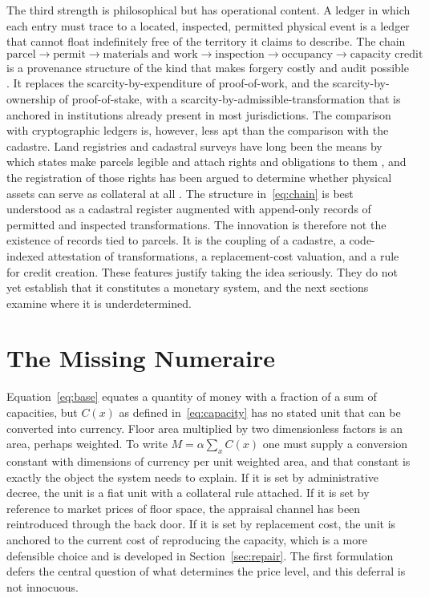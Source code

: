 \documentclass[11pt]{article}
\theoremstyle{definition}
\begin{document}
The third strength is philosophical but has operational content. A ledger in which each entry must trace to a located, inspected, permitted physical event is a ledger that cannot float indefinitely free of the territory it claims to describe. The chain
\begin{equation}
\text{parcel} \to \text{permit} \to \text{materials and work} \to \text{inspection} \to \text{occupancy} \to \text{capacity credit}
\label{eq:chain}
\end{equation}
is a provenance structure of the kind that makes forgery costly and audit possible \cite{buneman2001}. It replaces the scarcity-by-expenditure of proof-of-work, and the scarcity-by-ownership of proof-of-stake, with a scarcity-by-admissible-transformation that is anchored in institutions already present in most jurisdictions. The comparison with cryptographic ledgers is, however, less apt than the comparison with the cadastre. Land registries and cadastral surveys have long been the means by which states make parcels legible and attach rights and obligations to them \cite{scott1998}, and the registration of those rights has been argued to determine whether physical assets can serve as collateral at all \cite{desoto2000}. The structure in~\eqref{eq:chain} is best understood as a cadastral register augmented with append-only records of permitted and inspected transformations. The innovation is therefore not the existence of records tied to parcels. It is the coupling of a cadastre, a code-indexed attestation of transformations, a replacement-cost valuation, and a rule for credit creation. These features justify taking the idea seriously. They do not yet establish that it constitutes a monetary system, and the next sections examine where it is underdetermined.

\section{The Missing Numeraire}

Equation~\eqref{eq:base} equates a quantity of money with a fraction of a sum of capacities, but $C(x)$ as defined in~\eqref{eq:capacity} has no stated unit that can be converted into currency. Floor area multiplied by two dimensionless factors is an area, perhaps weighted. To write $M=\alpha\sum_x C(x)$ one must supply a conversion constant with dimensions of currency per unit weighted area, and that constant is exactly the object the system needs to explain. If it is set by administrative decree, the unit is a fiat unit with a collateral rule attached. If it is set by reference to market prices of floor space, the appraisal channel has been reintroduced through the back door. If it is set by replacement cost, the unit is anchored to the current cost of reproducing the capacity, which is a more defensible choice and is developed in Section~\ref{sec:repair}. The first formulation defers the central question of what determines the price level, and this deferral is not innocuous.
\end{document}
